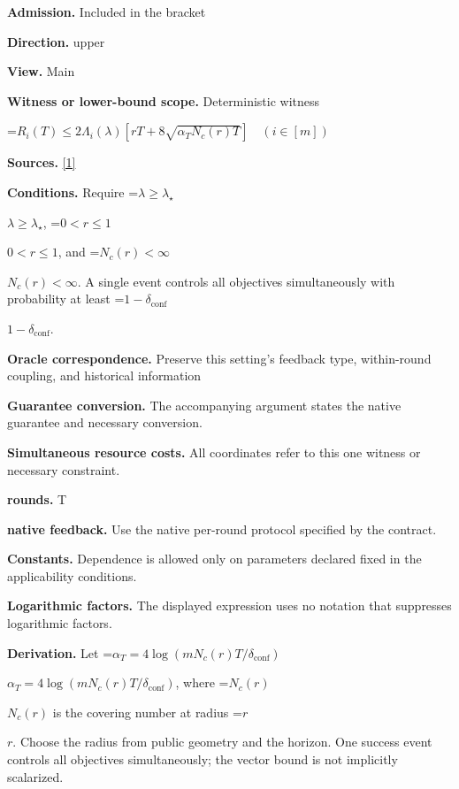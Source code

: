\documentclass[10pt,a4paper]{article}
\newcommand{\AtlasMath}[1]{\par\begingroup\centering\setbox0=\hbox{$\displaystyle #1$}\ifdim\wd0>1.4\linewidth\typeout{ATLAS WIDE FORMULA: \the\wd0}\fi\ifdim\wd0>\linewidth\resizebox{\linewidth}{!}{\box0}\else\box0\fi\par\endgroup}
\newcommand{\AtlasInlineMath}[1]{\begingroup\setbox0=\hbox{$#1$}\ifdim\wd0>.4\linewidth\endgroup\AtlasMath{#1}\else\endgroup$#1$\fi}
\begin{document}
\textbf{Admission.} Included in the bracket



\textbf{Direction.} upper



\textbf{View.} Main



\textbf{Witness or lower-bound scope.} Deterministic witness



\AtlasMath{R_i(T)\le2\Lambda_i(\lambda)\left[rT+8\sqrt{\alpha_TN_c(r)T}\right]\quad(i\in[m])}


\textbf{Sources.} \href{https://jmlr.org/papers/volume26/24-1047/24-1047.pdf}{[1]}



\textbf{Conditions.} Require \AtlasInlineMath{\lambda\ge\lambda_\star}, \AtlasInlineMath{0<r\le1}, and \AtlasInlineMath{N_c(r)<\infty}. A single event controls all objectives simultaneously with probability at least \AtlasInlineMath{1-\delta_{\mathrm{conf}}}.



\textbf{Oracle correspondence.} Preserve this setting's feedback type, within-round coupling, and historical information



\textbf{Guarantee conversion.} The accompanying argument states the native guarantee and necessary conversion.



\textbf{Simultaneous resource costs.} All coordinates refer to this one witness or necessary constraint.



\textbf{rounds.} T



\textbf{native feedback.} Use the native per-round protocol specified by the contract.



\textbf{Constants.} Dependence is allowed only on parameters declared fixed in the applicability conditions.



\textbf{Logarithmic factors.} The displayed expression uses no notation that suppresses logarithmic factors.



\textbf{Derivation.} Let \AtlasInlineMath{\alpha_T=4\log(mN_c(r)T/\delta_{\mathrm{conf}})}, where \AtlasInlineMath{N_c(r)} is the covering number at radius \AtlasInlineMath{r}. Choose the radius from public geometry and the horizon. One success event controls all objectives simultaneously; the vector bound is not implicitly scalarized.
\end{document}
